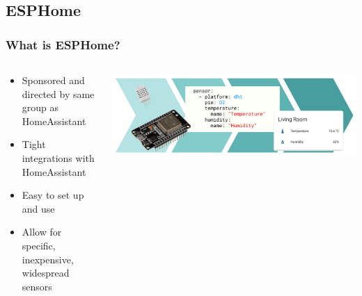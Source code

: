 \documentclass[aspectratio=169]{beamer}
\begin{document}
\subsection{ESPHome}
\frame{\subsectionpage}
\begin{frame}[fragile]
  \frametitle{What is ESPHome?}
  \begin{columns}[]
    \begin{column}[T]{0.45\paperwidth}
      \begin{itemize}%
        \item{Sponsored and directed by same group as HomeAssistant}
        \item{Tight integrations with HomeAssistant}
        \item{Easy to set up and use}
        \item{Allow for specific, inexpensive, widespread sensors}
     \end{itemize}
    \end{column}
    \begin{column}[T]{0.45\paperwidth}
      \includegraphics[width=0.45\paperwidth,keepaspectratio]{images/esp.png}
    \end{column}
  \end{columns}
\end{frame}
\end{document}
